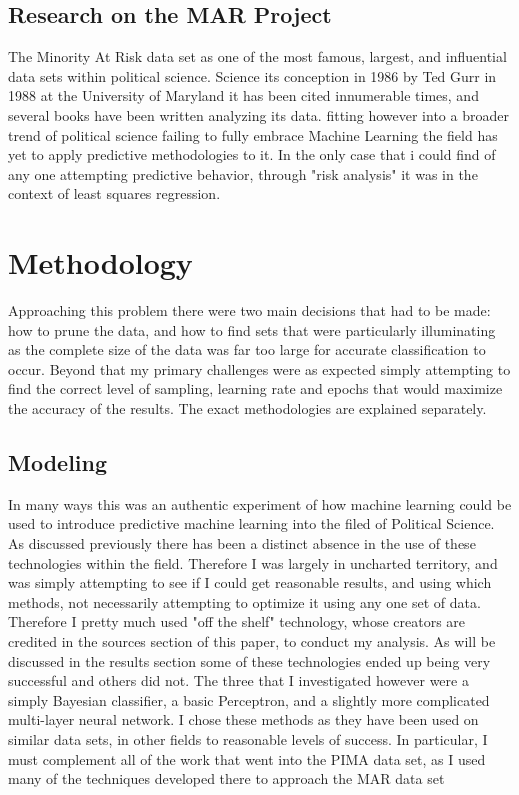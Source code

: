 \documentclass[12pt]{article}
\begin{document}
\subsection{Research on the MAR Project}
	The Minority At Risk data set as one of the most famous, largest, and influential data sets within political science. Science its conception in 1986 by Ted Gurr in 1988 at the University of Maryland it has been cited innumerable times, and several books have been written analyzing its data. fitting however into a broader trend of political science failing to fully embrace Machine Learning the field has yet to apply predictive methodologies to it. In the only case that i could find of any one attempting predictive behavior, through {"risk analysis"} it was in the context of least squares regression. 



\section{Methodology}
Approaching this problem there were two main decisions that had to be made: how to prune the data, and how to find sets that were particularly illuminating as  the complete size of the data was far too large for accurate classification to occur. Beyond that my primary challenges were as expected simply attempting to find the correct level of sampling, learning rate and epochs that would maximize the accuracy of the results. The exact methodologies are explained separately.

\subsection{Modeling}
In many ways this was an authentic experiment of how machine learning could be used to introduce predictive machine learning into the filed of Political Science. As discussed previously there has been a distinct absence in the use of these technologies within the field. Therefore I was largely in uncharted territory, and was simply attempting to see if I could get reasonable results, and using which methods, not necessarily attempting to optimize it using any one set of data. Therefore I pretty much used {"off the shelf"} technology, whose creators are credited in the sources section of this paper, to conduct my analysis. As will be discussed in the results section some of these technologies ended up being very successful and others did not. The three that I investigated however were a simply Bayesian classifier, a basic Perceptron, and a slightly more complicated multi-layer neural network. I chose these methods as they have been used on similar data sets, in other fields to reasonable levels of success. In particular, I must complement all of the work that went into the PIMA data set, as I used many of the techniques developed there to approach the MAR data set
\end{document}
